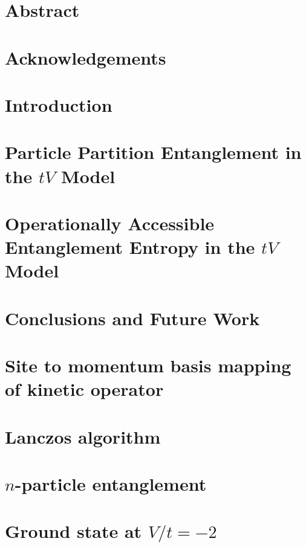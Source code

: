 \documentclass[12pt, two sided]{report}
\begin{document}



\chapter*{Abstract}
 

\chapter*{Acknowledgements}


\setcounter{page}{2}

\singlespacing
\tableofcontents
\doublespacing

\chapter{Introduction}



\chapter{Particle Partition Entanglement in the $tV$ Model}


\chapter{Operationally Accessible Entanglement Entropy in the $tV$ Model}


\chapter{Conclusions and Future Work}


\appendix

\chapter{Site to momentum basis mapping of kinetic operator}


\chapter{Lanczos algorithm}


\chapter{$n$-particle entanglement}


\chapter{Ground state at $V/t=-2$}



{} 

\end{document}
